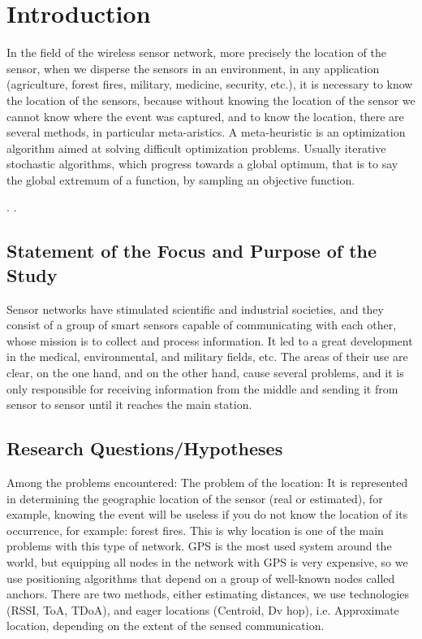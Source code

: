 \documentclass[paper=a4, fontsize=11pt]{scrartcl}
\numberwithin{equation}{section}		%
\numberwithin{figure}{section}			%
\numberwithin{table}{section}				%
\begin{document}
\section{Introduction}
In the field of the wireless sensor network, more precisely the location of the sensor, when we disperse the sensors in an environment, in any application (agriculture, forest fires, military, medicine, security, etc.), it is necessary to know the location of the sensors, because without knowing the location of the sensor we cannot know where the event was captured, and to know the location, there are several methods, in particular meta-aristics.
     A meta-heuristic is an optimization algorithm aimed at solving difficult optimization problems. Usually iterative stochastic algorithms, which progress towards a global optimum, that is to say the global extremum of a function, by sampling an objective function.



.
.
\subsection{Statement of the Focus and Purpose of the Study}
\begin{itemize}
   Sensor networks have stimulated scientific and industrial societies, and they consist of a group of smart sensors capable of communicating with each other, whose mission is to collect and process information.
 It led to a great development in the medical, environmental, and military fields, etc.
 The areas of their use are clear, on the one hand, and on the other hand, cause several problems, and it is only responsible for receiving information from the middle and sending it from sensor to sensor until it reaches the main station.
\end{itemize}

\subsection{Research Questions/Hypotheses}
    Among the problems encountered: The problem of the location: It is represented in determining the geographic location of the sensor (real or estimated), for example, knowing the event will be useless if you do not know the location of its occurrence, for example: forest fires.
 This is why location is one of the main problems with this type of network.
GPS is the most used system around the world, but equipping all nodes in the network with GPS is very expensive, so we use positioning algorithms that depend on a group of well-known nodes called anchors.
     There are two methods, either estimating distances, we use technologies (RSSI, ToA, TDoA), and eager locations (Centroid, Dv hop), i.e.  Approximate location, depending on the extent of the sensed communication.
\end{document}
